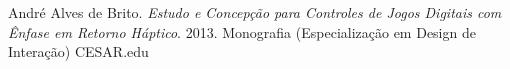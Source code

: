 

\begin{cvparagraph}
André Alves de Brito. \textit{Estudo e Concepção para Controles de Jogos Digitais com Ênfase em Retorno Háptico}. 2013. Monografia (Especialização em Design de Interação) CESAR.edu
\end{cvparagraph}


